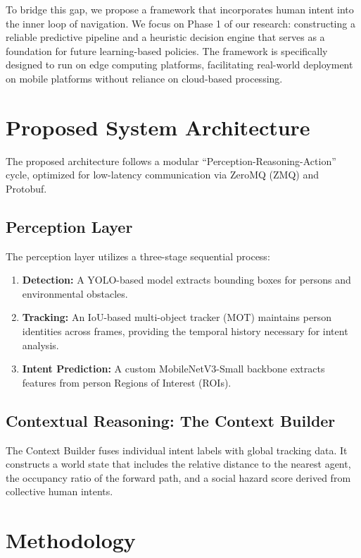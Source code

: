\documentclass[conference]{IEEEtran}
\begin{document}
To bridge this gap, we propose a framework that incorporates human intent into the inner loop of navigation. We focus on Phase 1 of our research: constructing a reliable predictive pipeline and a heuristic decision engine that serves as a foundation for future learning-based policies. The framework is specifically designed to run on edge computing platforms, facilitating real-world deployment on mobile platforms without reliance on cloud-based processing.

\section{Proposed System Architecture}
The proposed architecture follows a modular ``Perception-Reasoning-Action'' cycle, optimized for low-latency communication via ZeroMQ (ZMQ) and Protobuf.

\subsection{Perception Layer}
The perception layer utilizes a three-stage sequential process:
\begin{enumerate}
    \item \textbf{Detection:} A YOLO-based model \cite{redmon2016you} extracts bounding boxes for persons and environmental obstacles.
    \item \textbf{Tracking:} An IoU-based multi-object tracker (MOT) maintains person identities across frames, providing the temporal history necessary for intent analysis.
    \item \textbf{Intent Prediction:} A custom MobileNetV3-Small backbone \cite{howard2019searching} extracts features from person Regions of Interest (ROIs).
\end{enumerate}

\subsection{Contextual Reasoning: The Context Builder}
The Context Builder fuses individual intent labels with global tracking data. It constructs a world state that includes the relative distance to the nearest agent, the occupancy ratio of the forward path, and a social hazard score derived from collective human intents.

\section{Methodology}
\end{document}
